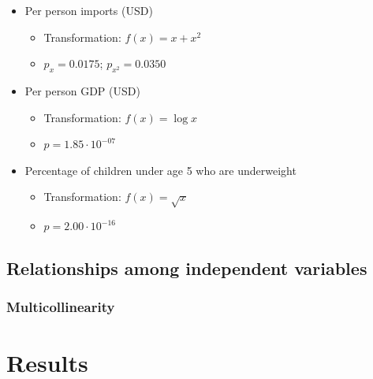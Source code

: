 \documentclass[oneside,12pt]{report}
\begin{document}
\begin{itemize}
\item Per person imports (USD)
	\begin{itemize}
	\item Transformation: \begin{math}f(x) = x + x^{2}\end{math}
	\item \begin{math}p_{x}=0.0175\end{math}; \begin{math}p_{x^{2}}=0.0350\end{math}
	\end{itemize}
\item Per person GDP (USD)
	\begin{itemize}
	\item Transformation: \begin{math}f(x) = \log{x}\end{math}
	\item \begin{math}p=1.85\cdot10^{-07}\end{math}
	\end{itemize}
\item Percentage of children under age 5 who are underweight
	\begin{itemize}
	\item Transformation: \begin{math}f(x) = \sqrt{x}\end{math}
	\item \begin{math}p=2.00\cdot10^{-16}\end{math}
	\end{itemize}
\end{itemize}

\section*{Relationships among independent variables}
\subsection*{Multicollinearity}



\chapter{Results}
\end{document}

